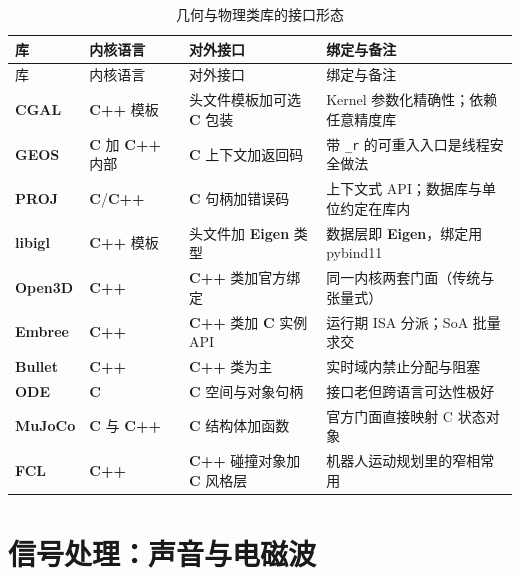 \documentclass[12pt,a4paper,fontset=fandol]{ctexbook}
\newcommand{\Tp}[1]{\texttt{#1}}
\newcommand{\Bk}{\allowbreak}
\newcommand{\Lib}[1]{\textbf{#1}}
\newcommand{\Lang}[1]{\textsf{\bfseries #1}}
\newcommand{\CL}{\Lang{C}}
\newcommand{\CPP}{\Lang{C++}}
\begin{document}
\begin{longtable}{@{}>{\raggedright\arraybackslash}p{}
  >{\raggedright\arraybackslash}p{}
  >{\raggedright\arraybackslash}p{}
  >{\raggedright\arraybackslash}p{}@{}}
\caption{几何与物理类库的接口形态}\label{tab:apA-geo}\\
\toprule
库 & 内核语言 & 对外接口 & 绑定与备注 \\
\midrule
\endfirsthead
\toprule
库 & 内核语言 & 对外接口 & 绑定与备注 \\
\midrule
\endhead
\Lib{CGAL} & \CPP{} 模板 & 头文件模板加可选 \CL{} 包装 &
  Kernel 参数化精确性；依赖任意精度库 \\
\Lib{GEOS} & \CL{} 加 \CPP{} 内部 & \CL{} 上下文加返回码 &
  带 \Tp{\_r} 的可重入入口是线程安全做法 \\
\Lib{PROJ} & \CL/{\Bk}\CPP{} & \CL{} 句柄加错误码 &
  上下文式 API；数据库与单位约定在库内 \\
\Lib{libigl} & \CPP{} 模板 & 头文件加 \Lib{Eigen} 类型 &
  数据层即 \Lib{Eigen}，绑定用 pybind11 \\
\Lib{Open3D} & \CPP{} & \CPP{} 类加官方绑定 &
  同一内核两套门面（传统与张量式） \\
\Lib{Embree} & \CPP{} & \CPP{} 类加 \CL{} 实例 API &
  运行期 ISA 分派；SoA 批量求交 \\
\Lib{Bullet} & \CPP{} & \CPP{} 类为主 &
  实时域内禁止分配与阻塞 \\
\Lib{ODE} & \CL{} & \CL{} 空间与对象句柄 &
  接口老但跨语言可达性极好 \\
\Lib{MuJoCo} & \CL{} 与 \CPP{} & \CL{} 结构体加函数 &
  官方门面直接映射 C 状态对象 \\
\Lib{FCL} & \CPP{} & \CPP{} 碰撞对象加 \CL{} 风格层 &
  机器人运动规划里的窄相常用 \\
\end{longtable}

\section{信号处理：声音与电磁波}
\end{document}
